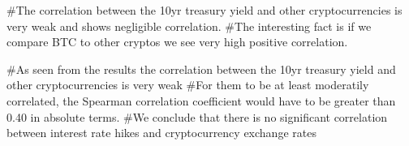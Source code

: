 #The correlation between the 10yr treasury yield and other cryptocurrencies is very weak and shows negligible correlation.
#The interesting fact is if we compare BTC to other cryptos we see very high positive correlation.


#As seen from the results the correlation between the 10yr treasury yield and other cryptocurrencies is very weak
#For them to be at least moderatily correlated, the Spearman correlation coefficient would have to be greater than 0.40 in absolute terms.
#We conclude that there is no significant correlation between interest rate hikes and cryptocurrency exchange rates